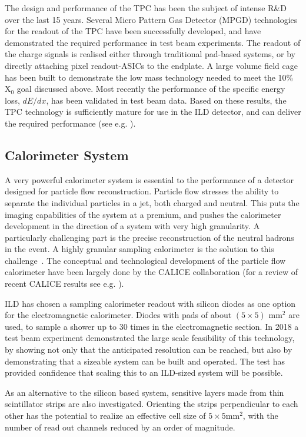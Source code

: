 \documentclass[%
 amsmath,amssymb,
 aps,
 longbibliography,
]{revtex4-1}
\begin{document}
The design and performance of the TPC has been the subject of intense {{R\&D}} over the last 15 years. Several Micro Pattern Gas Detector (MPGD) technologies for the readout of the TPC have been successfully developed, and have demonstrated the required performance in test beam experiments. The readout of the charge signals is realised either through traditional pad-based systems, or by directly attaching pixel readout-ASICs to the endplate. A large volume field cage has been built to demonstrate the low mass technology needed to meet the 10\% X$_0$ goal discussed above. Most recently the performance of the specific energy loss, $dE/dx$, has been validated in test beam data. Based on these results, the TPC technology is sufficiently mature for use in the ILD detector, and can deliver the required performance (see e.g. \cite{Attie:2016yeu,Bouchez:2007pe}). 


\subsection{Calorimeter System}
A very powerful calorimeter system is essential to the performance of a detector designed for particle flow reconstruction. Particle flow stresses the ability to separate the individual particles in a jet, both charged and neutral. This puts the imaging capabilities of the system at a premium, and pushes the calorimeter development in the direction of a system with very high granularity. A particularly challenging part is the precise reconstruction of the neutral hadrons in the event. A highly granular sampling calorimeter is the solution to this challenge~\cite{Sefkow:2015hna}. The conceptual and technological development of the particle flow calorimeter have been largely done by the CALICE collaboration (for a review of recent CALICE results see {e.g.} \cite{Grenier:2017ewg}). 

ILD has chosen a sampling calorimeter readout with silicon diodes as one option for the electromagnetic calorimeter. Diodes with pads of about $(5 \times 5)$ mm$^2$ are used, to sample a shower up to 30 times in the electromagnetic section. In 2018 a test beam experiment demonstrated the large scale feasibility of this technology, by showing not only that the anticipated resolution can be reached, but also by demonstrating that a sizeable system can be built and operated. The test has provided confidence that scaling this to an ILD-sized system will be possible.

As an alternative to the silicon based system, sensitive layers made from thin scintillator strips are also investigated. Orienting the strips perpendicular to each other has the potential to realize an effective cell size of $5\times 5$mm$^2$, with the number of read out channels reduced by an order of magnitude. 
\end{document}

